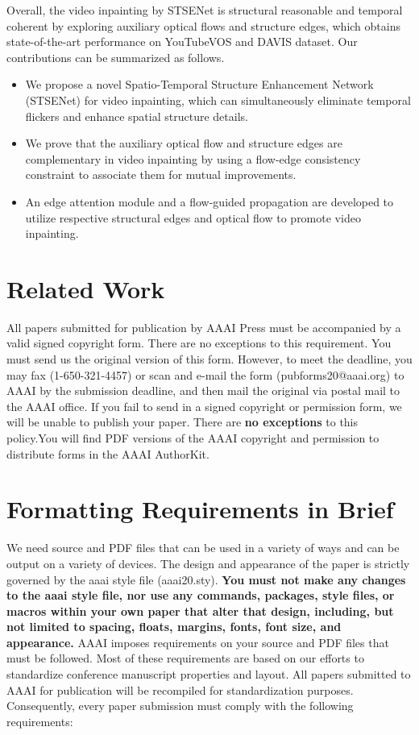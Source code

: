 \documentclass[letterpaper]{article} %
\begin{document}
Overall, the video inpainting by STSENet is structural reasonable and temporal coherent by exploring auxiliary optical flows and structure edges, which obtains state-of-the-art performance on YouTubeVOS and DAVIS dataset. Our contributions can be summarized as follows.
\begin{itemize}
	\item We propose a novel Spatio-Temporal Structure Enhancement Network (STSENet) for video inpainting, which can simultaneously eliminate temporal flickers and enhance spatial structure details.
	\item We prove that the auxiliary optical flow and structure edges are complementary in video inpainting by using a flow-edge consistency constraint to associate them for mutual improvements.
	\item An edge attention module and a flow-guided propagation are developed to utilize respective structural edges and optical flow to promote video inpainting.			
\end{itemize}



	
\section{Related Work}



All papers submitted for publication by AAAI Press must be accompanied by a valid signed copyright form. There are no exceptions to this requirement. You must send us the original version of this form. However, to meet the deadline, you may fax (1-650-321-4457) or scan and e-mail the form (pubforms20@aaai.org) to AAAI by the submission deadline, and then mail the original via postal mail to the AAAI office. If you fail to send in a signed copyright or permission form, we will be unable to publish your paper. There are \textbf{no exceptions} to this policy.You will find PDF versions of the AAAI copyright and permission to distribute forms in the AAAI AuthorKit.

\section{Formatting Requirements in Brief}
We need source and PDF files that can be used in a variety of ways and can be output on a variety of devices. The design and appearance of the paper is strictly governed by the aaai style file (aaai20.sty). 
\textbf{You must not make any changes to the aaai style file, nor use any commands, packages, style files, or macros within your own paper that alter that design, including, but not limited to spacing, floats, margins, fonts, font size, and appearance.} AAAI imposes requirements on your source and PDF files that must be followed. Most of these requirements are based on our efforts to standardize conference manuscript properties and layout. All papers submitted to AAAI for publication will be recompiled for standardization purposes. Consequently, every paper submission must comply with the following requirements:
\end{document}
